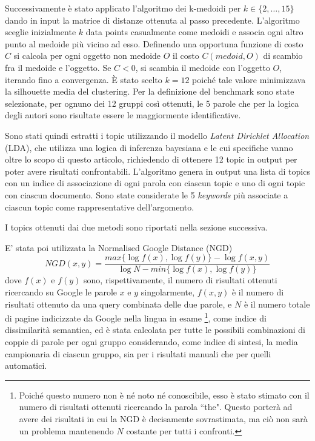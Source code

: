 \documentclass[]{article}
\begin{document}
Successivamente è stato applicato l'algoritmo dei k-medoidi per $k \in \{2, \dots, 15\}$ dando in input la matrice di distanze ottenuta al passo precedente. L'algoritmo sceglie inizialmente $k$ data points casualmente come medoidi e associa ogni altro punto al medoide più vicino ad esso.
Definendo una opportuna funzione di costo $C$ si calcola per ogni oggetto non medoide $O$ il costo $C(medoid, O)$ di scambio fra il medoide e l'oggetto.  Se $C<0$, si scambia il medoide con l'oggetto $O$, iterando fino a convergenza.
\newline
È stato scelto $k=12$ poiché tale valore minimizzava la silhouette media del clustering.
\newline
Per la definizione del benchmark sono state selezionate, per ognuno dei 12 gruppi così ottenuti, le 5 parole che per la logica degli autori sono risultate essere le maggiormente identificative.


Sono stati quindi estratti i topic utilizzando il modello \textit{Latent Dirichlet Allocation} (LDA), che utilizza una logica di inferenza bayesiana \cite{survey} e le cui specifiche vanno oltre lo scopo di questo articolo, richiedendo di ottenere 12 topic in output per poter avere risultati confrontabili.
L'algoritmo genera in output una lista di topics con un indice di associazione di ogni parola con ciascun topic e uno di ogni topic con ciascun documento.
Sono state considerate le 5 \textit{keywords} più associate a ciascun topic come rappresentative dell'argomento.


I topics ottenuti dai due metodi sono riportati nella sezione successiva.


E' stata poi utilizzata la Normalised Google Distance (NGD) \cite{NGD} \[NGD(x,y)=\frac{max\{\log f(x),\log f(y)\}-\log f(x,y)}{\log N-min\{\log f(x),\log f(y)\}} \]
dove $f(x)$ e $f(y)$ sono, rispettivamente, il numero di risultati ottenuti ricercando su Google le parole $x$ e $y$ singolarmente, $f(x,y)$ è il numero di risultati ottenuto da una query combinata delle due parole, e $N$ è il numero totale di pagine indicizzate da Google nella lingua in esame \footnote{Poiché questo numero non è né noto né conoscibile, esso è stato stimato con il numero di risultati ottenuti ricercando la parola ``the". Questo porterà ad avere dei risultati in cui la NGD è decisamente sovrastimata, ma ciò non sarà un problema mantenendo $N$ costante per tutti i confronti.}, come indice di dissimilarità semantica, ed è stata calcolata per tutte le possibili combinazioni di coppie di parole per ogni gruppo considerando, come indice di sintesi, la media campionaria di ciascun gruppo, sia per i risultati manuali che per quelli automatici.
\end{document}
